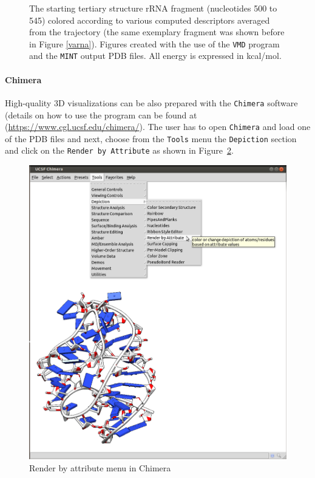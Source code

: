 \documentclass[12pt]{article}
\begin{document}
\begin{figure}[h!]
\begin{center}
\end{center}
\caption{The starting tertiary structure rRNA fragment (nucleotides 500 to 545) colored according to various computed descriptors averaged from the trajectory (the same exemplary fragment was shown before in Figure \ref{varna}). Figures created with the use of the {\tt VMD} program and the {\tt MINT} output PDB files. All energy is expressed in kcal/mol.}
\label{3Ddifferent}
\end{figure} 



\paragraph{Chimera}
High-quality 3D visualizations can be also prepared with the {\tt Chimera} software (details on how to use the program can be found at (\url{https://www.cgl.ucsf.edu/chimera/}). The user has to open {\tt Chimera} and load one of the PDB files and next, choose from the {\tt Tools} menu the {\tt Depiction} section and click on the {\tt Render by Attribute} as shown in Figure~\ref{chimera1}.

\begin{figure}[h!]
\centering
\includegraphics[scale=0.27]{./pictures/chimera1.png}
\caption{Render by attribute menu in Chimera}
\label{chimera1}
\end{figure}
\end{document}
